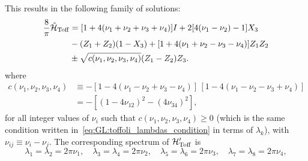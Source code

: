 This results in the following family of solutions:
\begin{equation}
\begin{aligned}
	\frac{8}{\pi}\tilde{{\mathcal{H}}}_{\operatorname{Toff}} &=
	[1 + 4(\nu_1+\nu_2+\nu_3+\nu_4)] I +
	2[4(\nu_1-\nu_2) - 1] X_3 \\
	&- (Z_1 + Z_2)(1 - X_3) +
	[1 + 4(\nu_1+\nu_2-\nu_3-\nu_4)] Z_1 Z_2 \\
	&\pm \sqrt{c(\nu_1,\nu_2,\nu_3,\nu_4)} (Z_1 - Z_2)Z_3.
\end{aligned}
\label{eq:GL:toff_tilde_general_solution}
\end{equation}
where
\begin{equation}
\begin{split}
	c(\nu_1, \nu_2, \nu_3, \nu_4) &\equiv
		-[1 - 4(\nu_1 - \nu_2 + \nu_3 - \nu_4)]
		\, [1 - 4(\nu_1 - \nu_2 - \nu_3 + \nu_4)]\\
		&= -[(1-4\nu_{12})^2-(4\nu_{34})^2],
\end{split}
\end{equation}
for all integer values of $\nu_i$ such that $c(\nu_1, \nu_2, \nu_3, \nu_4) \ge 0$ (which is the same condition written in~\cref{eq:GL:toffoli_lambdas_condition} in terms of $\lambda_k$), with $\nu_{ij}\equiv\nu_i-\nu_j$.
The corresponding spectrum of ${\mathcal{H}}'_{\operatorname{Toff}}$ is
\begin{equation}
	\lambda_1 = \lambda_2 = 2\pi \nu_1, \quad
	\lambda_3 = \lambda_4 = 2\pi \nu_2, \quad
	\lambda_5 = \lambda_6 = 2\pi \nu_3, \quad
	\lambda_7 = \lambda_8 = 2\pi \nu_4, 
\end{equation}
